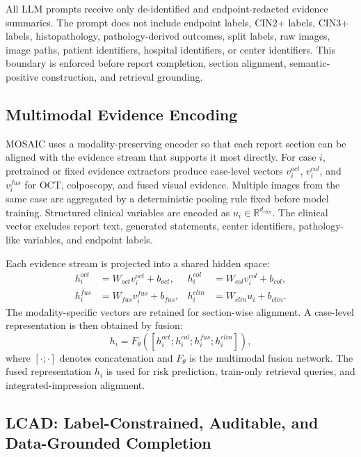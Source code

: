 All LLM prompts receive only de-identified and endpoint-redacted evidence summaries. The prompt does not include endpoint labels, CIN2+ labels, CIN3+ labels, histopathology, pathology-derived outcomes, split labels, raw images, image paths, patient identifiers, hospital identifiers, or center identifiers. This boundary is enforced before report completion, section alignment, semantic-positive construction, and retrieval grounding.

\subsection{Multimodal Evidence Encoding}
\label{subsec:evidence_encoding_final_topcs}

MOSAIC uses a modality-preserving encoder so that each report section can be aligned with the evidence stream that supports it most directly. For case $i$, pretrained or fixed evidence extractors produce case-level vectors $v_i^{oct}$, $v_i^{col}$, and $v_i^{fus}$ for OCT, colposcopy, and fused visual evidence. Multiple images from the same case are aggregated by a deterministic pooling rule fixed before model training. Structured clinical variables are encoded as $u_i\in\mathbb{R}^{d_{clin}}$. The clinical vector excludes report text, generated statements, center identifiers, pathology-like variables, and endpoint labels.

Each evidence stream is projected into a shared hidden space:
\begin{equation}
\begin{aligned}
h_i^{oct} &= W_{oct}v_i^{oct}+b_{oct},&
h_i^{col} &= W_{col}v_i^{col}+b_{col},\\
h_i^{fus} &= W_{fus}v_i^{fus}+b_{fus},&
h_i^{clin} &= W_{clin}u_i+b_{clin}.
\end{aligned}
\label{eq:mosaic_modality_projection_final_topcs}
\end{equation}
The modality-specific vectors are retained for section-wise alignment. A case-level representation is then obtained by fusion:
\begin{equation}
h_i=
F_{\theta}([h_i^{oct};h_i^{col};h_i^{fus};h_i^{clin}]),
\label{eq:mosaic_fused_representation_final_topcs}
\end{equation}
where $[\cdot;\cdot]$ denotes concatenation and $F_{\theta}$ is the multimodal fusion network. The fused representation $h_i$ is used for risk prediction, train-only retrieval queries, and integrated-impression alignment.

\subsection{LCAD: Label-Constrained, Auditable, and Data-Grounded Completion}
\label{subsec:lcad_final_topcs}

